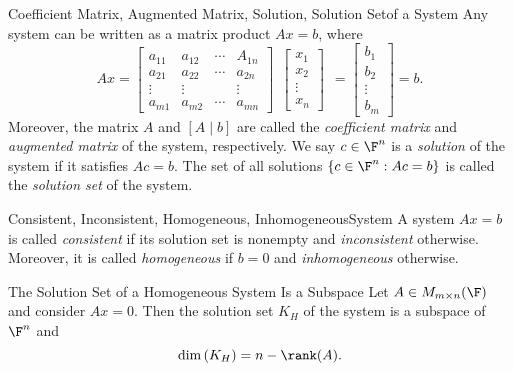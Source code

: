 \documentclass[linearalgebraI]{subfiles}
\begin{document}
    \begin{definition}{Coefficient Matrix, Augmented Matrix, Solution, Solution Set}{of a System}
        Any system can be written as a matrix product $Ax = b$, where
        \begin{equation*}
            Ax = 
            \begin{bmatrix}
                a_{11} & a_{12} & \cdots & A_{1n} \\ a_{21} & a_{22} & \cdots & a_{2n} \\ \vdots & \vdots & & \vdots \\ a_{m1} & a_{m2} & \cdots & a_{mn}
            \end{bmatrix} \ \ 
            \begin{bmatrix}
                x_1 \\ x_2 \\ \vdots \\ x_n
            \end{bmatrix} \ \ 
            =
            \begin{bmatrix}
                b_1 \\ b_2 \\ \vdots \\ b_m
            \end{bmatrix}
            = b.
        \end{equation*}
        Moreover, the matrix $A$ and $[A\mid b]$ are called the \emph{coefficient matrix} and \emph{augmented matrix} of the system, respectively. We say $c\in \F^n$ is a \emph{solution} of the system if it satisfies $Ac=b$. The set of all solutions $\left\lbrace c\in \F^n: Ac=b \right\rbrace$ is called the \emph{solution set} of the system.
    \end{definition}

    \begin{definition}{Consistent, Inconsistent, Homogeneous, Inhomogeneous}{System}
        A system $Ax= b$ is called \emph{consistent} if its solution set is nonempty and \emph{inconsistent} otherwise. Moreover, it is called \emph{homogeneous} if $b=0$ and \emph{inhomogeneous} otherwise.
    \end{definition}

    \begin{prop}{The Solution Set of a Homogeneous System Is a Subspace}
        Let $A\in M_{m\times n}(\F)$ and consider $Ax=0$. Then the solution set $K_H$ of the system is a subspace of $\F^n$ and
        \begin{equation*}
            \dim\left( K_H \right)  = n - \rank(A).
        \end{equation*}
    \end{prop}
\end{document}
